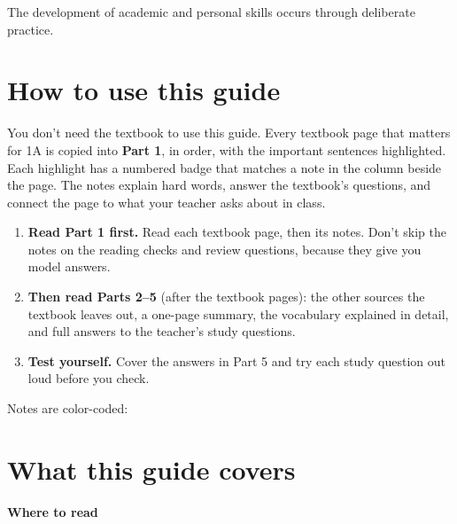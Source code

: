 \documentclass[11pt,letterpaper]{article}
\begin{document}
  {The development of academic and personal skills occurs through deliberate practice.}

\section{How to use this guide}

You don't need the textbook to use this guide. Every textbook page that matters for 1A is copied into \textbf{Part 1}, in order, with the important sentences highlighted. Each highlight has a numbered badge that matches a note in the column beside the page. The notes explain hard words, answer the textbook's questions, and connect the page to what your teacher asks about in class.

\begin{enumerate}
  \item \textbf{Read Part 1 first.} Read each textbook page, then its notes. Don't skip the notes on the reading checks and review questions, because they give you model answers.
  \item \textbf{Then read Parts 2–5} (after the textbook pages): the other sources the textbook leaves out, a one-page summary, the vocabulary explained in detail, and full answers to the teacher's study questions.
  \item \textbf{Test yourself.} Cover the answers in Part 5 and try each study question out loud before you check.
\end{enumerate}

Notes are color-coded:
\notelegend

\section{What this guide covers}

\textbf{Where to read}
\end{document}
